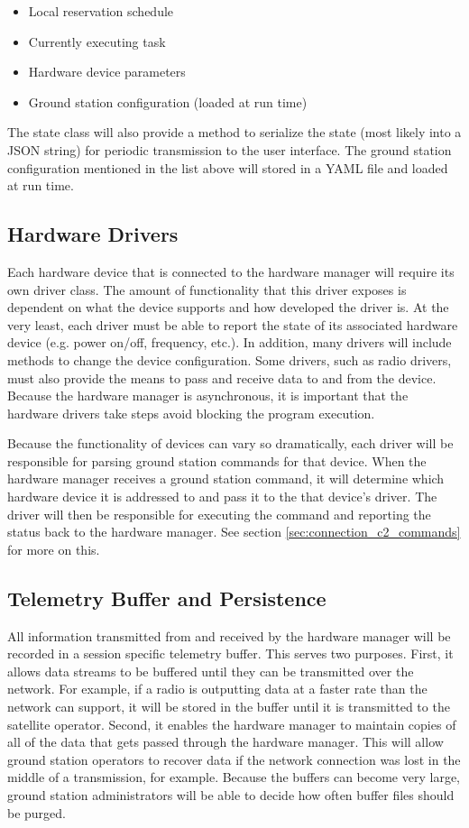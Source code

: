 \documentclass{mxl-design}
\begin{document}
\begin{itemize}
	\item Local reservation schedule
	\item Currently executing task
	\item Hardware device parameters
	\item Ground station configuration (loaded at run time)
\end{itemize}

The state class will also provide a method to serialize the state (most likely into a JSON string) for periodic transmission to the user interface. The ground station configuration mentioned in the list above will stored in a YAML file and loaded at run time.

\subsection{Hardware Drivers}
\label{sec:drivers}
Each hardware device that is connected to the hardware manager will require its own driver class. The amount of functionality that this driver exposes is dependent on what the device supports and how developed the driver is. At the very least, each driver must be able to report the state of its associated hardware device (e.g. power on/off, frequency, etc.). In addition, many drivers will include methods to change the device configuration. Some drivers, such as radio drivers, must also provide the means to pass and receive data to and from the device. Because the hardware manager is asynchronous, it is important that the hardware drivers take steps avoid blocking the program execution.

Because the functionality of devices can vary so dramatically, each driver will be responsible for parsing ground station commands for that device. When the hardware manager receives a ground station command, it will determine which hardware device it is addressed to and pass it to the that device's driver. The driver will then be responsible for executing the command and reporting the status back to the hardware manager. See section \ref{sec:connection_c2_commands} for more on this.

\subsection{Telemetry Buffer and Persistence}
\label{sec:telemetry_buffer}
All information transmitted from and received by the hardware manager will be recorded in a session specific telemetry buffer. This serves two purposes. First, it allows data streams to be buffered until they can be transmitted over the network. For example, if a radio is outputting data at a faster rate than the network can support, it will be stored in the buffer until it is transmitted to the satellite operator. Second, it enables the hardware manager to maintain copies of all of the data that gets passed through the hardware manager. This will allow ground station operators to recover data if the network connection was lost in the middle of a transmission, for example. Because the buffers can become very large, ground station administrators will be able to decide how often buffer files should be purged.
\end{document}
